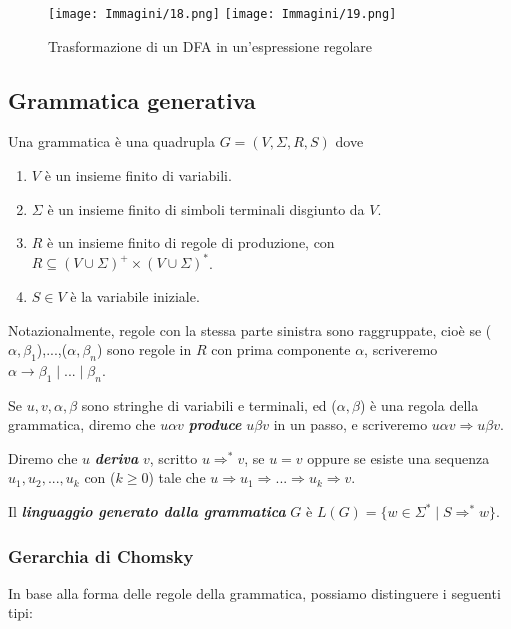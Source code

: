 \documentclass{article}
\begin{document}
\begin{figure}[H]
    \centering
    \texttt{[image: Immagini/18.png]}
    \texttt{[image: Immagini/19.png]}
    \caption{Trasformazione di un DFA in un'espressione regolare}
    \label{fig:your_image}
\end{figure}

\subsection{Grammatica generativa}
\begin{tcolorbox}[colback=blue!10!white, colframe=blue!50!black, title=Definizione 2.35]
    Una grammatica è una quadrupla $G = (V,\Sigma,R,S)$ dove
    \begin{enumerate}
        \item $V$ è un insieme finito di variabili.
        \item $\Sigma$ è un insieme finito di simboli terminali disgiunto da $V$.
        \item $R$ è un insieme finito di regole di produzione, con $R \subseteq (V \cup \Sigma)^+ \times (V \cup \Sigma)^*$.
        \item $S \in V$ è la variabile iniziale.
    \end{enumerate}
\end{tcolorbox}
Notazionalmente, regole con la stessa parte sinistra sono raggruppate, cioè se ($\alpha,\beta_1$),...,($\alpha,\beta_n$) sono regole in $R$ con prima componente $\alpha$, scriveremo $\alpha \rightarrow \beta_1 \mid ... \mid \beta_n$.

Se $u,v,\alpha,\beta$ sono stringhe di variabili e terminali, ed ($\alpha,\beta$) è una regola della grammatica, diremo che $u\alpha v$  \textit{\textbf{produce}} $u\beta v$ in un passo, e scriveremo $u\alpha v \Rightarrow u\beta v$.

Diremo che $u$ \textit{\textbf{deriva}} $v$, scritto $u \Rightarrow^* v$, se $u = v$ oppure se esiste una sequenza $u_1, u_2, ..., u_k$ con ($k \geq 0$) tale che $u \Rightarrow u_1 \Rightarrow ... \Rightarrow u_k \Rightarrow v$.

Il \textit{\textbf{linguaggio generato dalla grammatica}} $G$ è $L(G) = \{w \in \Sigma^* \mid S \Rightarrow^* w\}$.

\subsubsection{Gerarchia di Chomsky}
In base alla forma delle regole della grammatica, possiamo distinguere i seguenti tipi:
\end{document}
